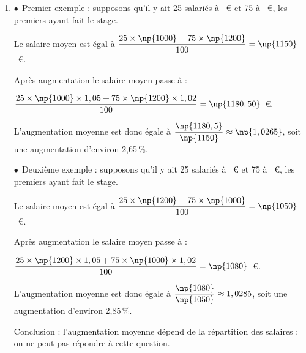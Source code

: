 \begin{enumerate}
\begin{enumerate}
Soit $p(X\leqslant5)$. À la calculatrice, $p(X\leqslant5)\approx 0,617$.\\ Cela signifie que la probabilité qu'au plus 5 salariés aient effectué le stage, est égale à 0,617.
	 
	 La probabilité qu'au moins 6 salariés suivent le stage est d'environ 0,617.
	\item $p(X\geqslant 6)=1-p(X<6)=1-p(X\leqslant5)\approx 1-0,617\approx0,383$
\end{enumerate}
\item 



$\bullet~~$Premier exemple : supposons qu'il y ait 25 salariés à ~\euro{} et 75 à ~\euro{}, les premiers ayant fait le stage.

Le salaire moyen est égal à $\dfrac{25 \times \np{1000} + 75 \times \np{1200}}{100} = \np{1150}$~\euro.

Après augmentation le salaire moyen passe à :

$\dfrac{25 \times \np{1000} \times 1,05 + 75 \times\np{1200}\times 1,02}{100} = \np{1180,50}$~\euro.

L'augmentation moyenne est donc égale à $\dfrac{\np{1180,5}}{\np{1150}}\approx \np{1,0265}$, soit une augmentation d'environ 2,65\,\%.

$\bullet~~$Deuxième exemple : supposons qu'il y ait 25 salariés à ~\euro{} et 75 à ~\euro{}, les premiers ayant fait le stage.

Le salaire moyen est égal à $\dfrac{25 \times \np{1200} + 75 \times \np{1000}}{100} = \np{1050}$~\euro.

Après augmentation le salaire moyen passe à :

$\dfrac{25 \times \np{1200} \times 1,05 + 75 \times\np{1000}\times 1,02}{100} = \np{1080}$~\euro.

L'augmentation moyenne est donc égale à $\dfrac{\np{1080}}{\np{1050}}\approx 1,0285$, soit une augmentation d'environ 2,85\,\%.

Conclusion : l'augmentation moyenne dépend de la répartition des salaires : on ne peut pas répondre à cette question.
\end{enumerate}

\bigskip

